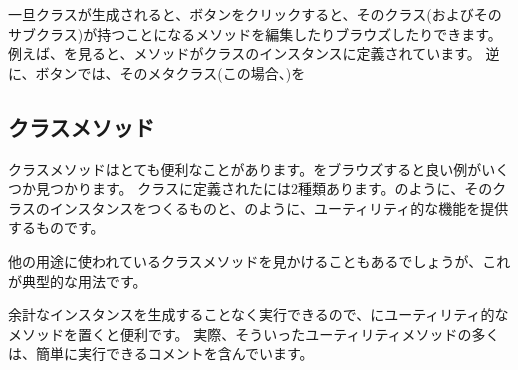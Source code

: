 \documentclass[a4paper,10pt,twoside]{book}
\begin{document}
一旦クラスが生成されると、ボタンをクリックすると、そのクラス(およびそのサブクラス)が持つことになるメソッドを編集したりブラウズしたりできます。例えば、を見ると、メソッドがクラスのインスタンスに定義されています。
逆に、ボタンでは、そのメタクラス(この場合、)を

\subsection{クラスメソッド} 

クラスメソッドはとても便利なことがあります。をブラウズすると良い例がいくつか見つかります。
クラスに定義されたには2種類あります。のように、そのクラスのインスタンスをつくるものと、のように、ユーティリティ的な機能を提供するものです。

他の用途に使われているクラスメソッドを見かけることもあるでしょうが、これが典型的な用法です。

余計なインスタンスを生成することなく実行できるので、にユーティリティ的なメソッドを置くと便利です。
実際、そういったユーティリティメソッドの多くは、簡単に実行できるコメントを含んでいます。
\end{document}
